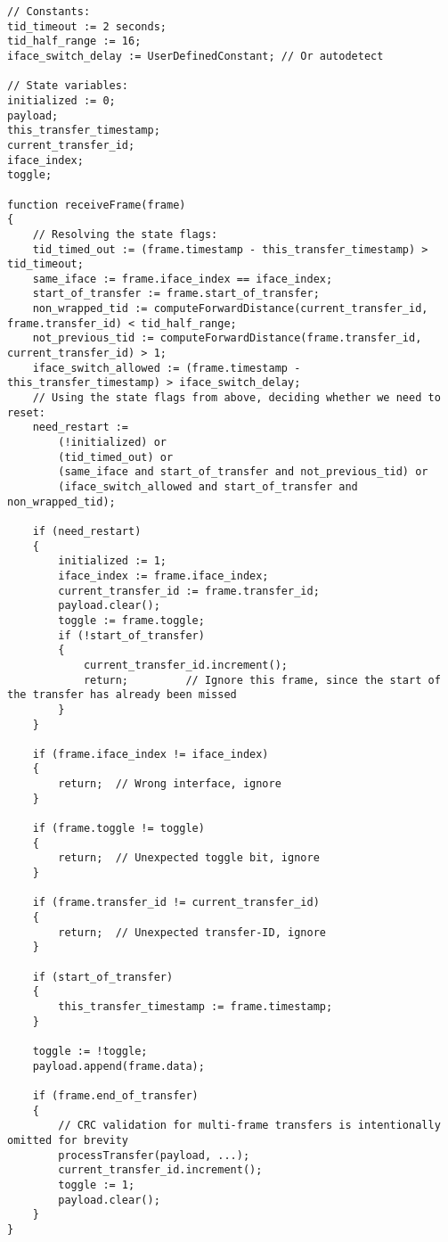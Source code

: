 \clearpage
\begin{verbatim}
// Constants:
tid_timeout := 2 seconds;
tid_half_range := 16;
iface_switch_delay := UserDefinedConstant; // Or autodetect

// State variables:
initialized := 0;
payload;
this_transfer_timestamp;
current_transfer_id;
iface_index;
toggle;

function receiveFrame(frame)
{
    // Resolving the state flags:
    tid_timed_out := (frame.timestamp - this_transfer_timestamp) > tid_timeout;
    same_iface := frame.iface_index == iface_index;
    start_of_transfer := frame.start_of_transfer;
    non_wrapped_tid := computeForwardDistance(current_transfer_id, frame.transfer_id) < tid_half_range;
    not_previous_tid := computeForwardDistance(frame.transfer_id, current_transfer_id) > 1;
    iface_switch_allowed := (frame.timestamp - this_transfer_timestamp) > iface_switch_delay;
    // Using the state flags from above, deciding whether we need to reset:
    need_restart :=
        (!initialized) or
        (tid_timed_out) or
        (same_iface and start_of_transfer and not_previous_tid) or
        (iface_switch_allowed and start_of_transfer and non_wrapped_tid);

    if (need_restart)
    {
        initialized := 1;
        iface_index := frame.iface_index;
        current_transfer_id := frame.transfer_id;
        payload.clear();
        toggle := frame.toggle;
        if (!start_of_transfer)
        {
            current_transfer_id.increment();
            return;         // Ignore this frame, since the start of the transfer has already been missed
        }
    }

    if (frame.iface_index != iface_index)
    {
        return;  // Wrong interface, ignore
    }

    if (frame.toggle != toggle)
    {
        return;  // Unexpected toggle bit, ignore
    }

    if (frame.transfer_id != current_transfer_id)
    {
        return;  // Unexpected transfer-ID, ignore
    }

    if (start_of_transfer)
    {
        this_transfer_timestamp := frame.timestamp;
    }

    toggle := !toggle;
    payload.append(frame.data);

    if (frame.end_of_transfer)
    {
        // CRC validation for multi-frame transfers is intentionally omitted for brevity
        processTransfer(payload, ...);
        current_transfer_id.increment();
        toggle := 1;
        payload.clear();
    }
}
\end{verbatim}

